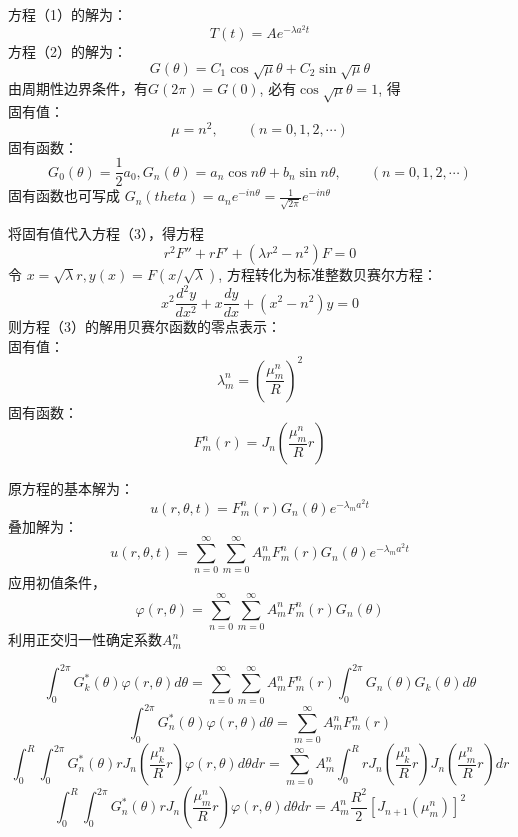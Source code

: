 \begin{frame}
	方程（1）的解为：\[T(t)=Ae^{-\lambda a^2 t}\]
	方程（2）的解为：\[G(\theta)=C_1\cos\sqrt{\mu}\theta + C_2\sin \sqrt{\mu}\theta \]
	由周期性边界条件，有$G(2\pi)=G(0)$, 必有$\cos \sqrt{\mu}\theta =1 $, 得\\
	固有值：
	\[\mu = n^2, \qquad (n=0,1,2,\cdots)\]
	固有函数：
	\[G_0(\theta)=\frac{1}{2}a_0, G_n(\theta)= a_n\cos n \theta + b_n \sin n \theta, \qquad (n=0,1,2,\cdots)\]
	固有函数也可写成 $ G_n(theta)=a_n e^{-i n \theta} =\frac{1}{\sqrt{2\pi}} e^{-i n \theta}$
\end{frame}	

\begin{frame}
	将固有值代入方程（3），得方程 
	\[r^2 F''+r F' +(\lambda r^2 -n^2 )F=0 \]
	令 $x=\sqrt{\lambda} r, y(x)=F(x/\sqrt{\lambda})$, 
	方程转化为标准整数贝赛尔方程：
	\begin{equation*}
		x^2\frac{d^2y}{dx^2} + x\frac{dy}{dx} +(x^2 -n^2)y=0
	\end{equation*}
	则方程（3）的解用贝赛尔函数的零点表示：\\
	固有值：
	\[\lambda_m ^n =(\frac{\mu_{m}^{n}}{R})^2 \]
	固有函数：\[F_m ^n(r) = J_n (\frac{\mu_{m}^{n}}{R}r) \]
\end{frame}	
\begin{frame}
	原方程的基本解为：
	\begin{equation*}
		u(r,\theta,t) =F_m ^n (r) G_n(\theta) e^{-\lambda_m a^2 t}
	\end{equation*}
	叠加解为：
	\begin{equation*}
		u(r,\theta,t) =\sum_{n=0}^{\infty} \sum_{m=0}^{\infty} A_m ^n F_m ^n (r) G_n(\theta) e^{-\lambda_m a^2 t}
	\end{equation*}
	应用初值条件， 
	\begin{equation*}
		\varphi(r, \theta)=\sum_{n=0}^{\infty} \sum_{m=0}^{\infty} A_m ^n F_m ^n (r) G_n(\theta) 
	\end{equation*}
	利用正交归一性确定系数$A_m ^n$
\end{frame}	

\begin{frame}
	\begin{equation*}
		 \int_0 ^{2\pi} G_k ^* (\theta) \varphi(r, \theta) d\theta =\sum_{n=0}^{\infty} \sum_{m=0}^{\infty} A_m ^n F_m ^n (r) \int_0 ^{2\pi} G_n(\theta) G_k(\theta) d\theta
	\end{equation*}
	\begin{equation*}
		 \int_0 ^{2\pi} G_n  ^* (\theta) \varphi(r, \theta) d\theta = \sum_{m=0}^{\infty} A_m ^n F_m ^n (r)
	\end{equation*}
	{\small \begin{equation*}
		\int_0 ^{R} \int_0 ^{2\pi} G_n ^* (\theta) r J_n (\frac{\mu_{k}^{n}}{R}r) \varphi(r, \theta) d\theta dr = \sum_{m=0}^{\infty} A_m ^n \int_0 ^{R} r J_n (\frac{\mu_{k}^{n}}{R}r)J_n (\frac{\mu_{m}^{n}}{R}r) dr
	\end{equation*}}
	\begin{equation*}
		\int_0 ^{R} \int_0 ^{2\pi} G_n ^* (\theta) r J_n (\frac{\mu_{m}^{n}}{R}r) \varphi(r, \theta) d\theta dr = A_m ^n \frac{R^2}{2} [J_{n+1}(\mu_m ^n)]^2
	\end{equation*}
\end{frame}	

